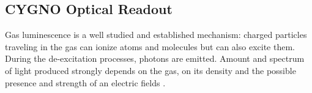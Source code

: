 \documentclass[physics,article,submit,moreauthors,pdftex]{Definitions/mdpi}
\begin{document}




\subsection{CYGNO Optical Readout}
\label{sect:opro}

Gas luminescence is a well studied and established mechanism: charged particles traveling in the gas can ionize atoms and molecules but can also excite them. During the de-excitation processes, photons are emitted. Amount and spectrum of light produced strongly depends on the gas, on its density and the possible presence and strength of an electric fields \cite{bib:Fraga, bib:Margato2, bib:lumi}.
\end{document}
